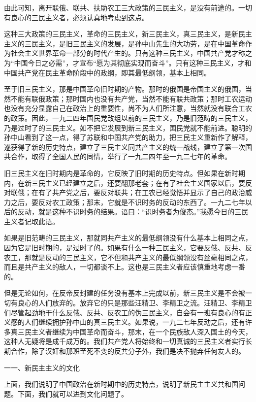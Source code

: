 \documentclass[UTF8, 12pt, a4paper]{ctexrep}
\begin{document}
由此可知，离开联俄、联共、扶助农工三大政策的三民主义，是没有前途的。一切有良心的三民主义者，必须认真地考虑到这点。

这种三大政策的三民主义，革命的三民主义，新三民主义，真三民主义，是新民主主义的三民主义，是旧三民主义的发展，是孙中山先生的大功劳，是在中国革命作为社会主义世界革命一部分的时代产生的。只有这种三民主义，中国共产党才称之为“中国今日之必需”，才宣布“愿为其彻底实现而奋斗”。只有这种三民主义，才和中国共产党在民主革命阶段中的政纲，即其最低纲领，基本上相同。

至于旧三民主义，那是中国革命旧时期的产物。那时的俄国是帝国主义的俄国，当然不能有联俄政策；那时国内也没有共产党，当然不能有联共政策；那时工农运动也没有充分显露自己在政治上的重要性，尚不为人们所注意，当然就没有联合工农的政策。因此，一九二四年国民党改组以前的三民主义，乃是旧范畴的三民主义，乃是过时了的三民主义。如不把它发展到新三民主义，国民党就不能前进。聪明的孙中山看到了这一点，得了苏联和中国共产党的助力，把三民主义重新作了解释，遂获得了新的历史特点，建立了三民主义同共产主义的统一战线，建立了第一次国共合作，取得了全国人民的同情，举行了一九二四年至一九二七年的革命。

旧三民主义在旧时期内是革命的，它反映了旧时期的历史特点。但如果在新时期内，在新三民主义已经建立之后，还要翻那老套；在有了社会主义国家以后，要反对联俄；在有了共产党之后，要反对联共；在工农已经觉悟并显示了自己的政治威力之后，要反对农工政策；那末，它就是不识时务的反动的东西了。一九二七年以后的反动，就是这种不识时务的结果。语曰：“识时务者为俊杰。”我愿今日的三民主义者记取此语。

如果是旧范畴的三民主义，那就同共产主义的最低纲领没有什么基本上相同之点，因为它是旧时期的，是过时了的。如果有什么一种三民主义，它要反俄、反共、反农工，那就是反动的三民主义，它不但和共产主义的最低纲领没有丝毫相同之点，而且是共产主义的敌人，一切都谈不上。这也是三民主义者应该慎重地考虑一番的。

但是无论如何，在反帝反封建的任务没有基本上完成以前，新三民主义是不会被一切有良心的人们放弃的。放弃它的只是那些汪精卫、李精卫之流。汪精卫、李精卫们尽管起劲地干什么反俄、反共、反农工的伪三民主义，自会有一班有良心的有正义感的人们继续拥护孙中山的真三民主义。如果说，一九二七年反动之后，还有许多真三民主义者继续为中国革命而奋斗，那末，在一个民族敌人深入国土的今天，这种人无疑将是成千成万的。我们共产党人将始终和一切真诚的三民主义者实行长期合作，除了汉奸和那班至死不变的反共分子外，我们是决不抛弃任何友人的。

一一、新民主主义的文化

上面，我们说明了中国政治在新时期中的历史特点，说明了新民主主义共和国问题。下面，我们就可以进到文化问题了。
\end{document}
